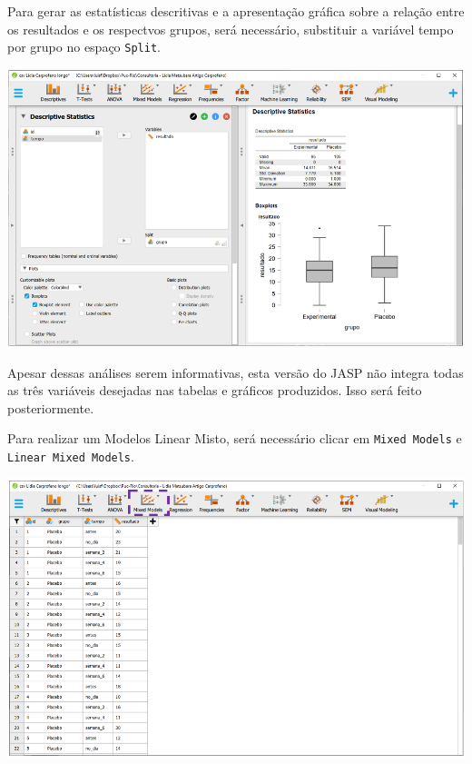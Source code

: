 \documentclass[
]{book}
\begin{document}
Para gerar as estatísticas descritivas e a apresentação gráfica sobre a
relação entre os resultados e os respectvos grupos, será necessário,
substituir a variável tempo por grupo no espaço \texttt{Split}.

\includegraphics{./img/cap_lmm_boxplots2.png}

Apesar dessas análises serem informativas, esta versão do JASP não
integra todas as três variáveis desejadas nas tabelas e gráficos
produzidos. Isso será feito posteriormente.

Para realizar um Modelos Linear Misto, será necessário clicar em
\texttt{Mixed\ Models} e \texttt{Linear\ Mixed\ Models}.

\includegraphics{./img/cap_lmm_interface.png}
\end{document}
